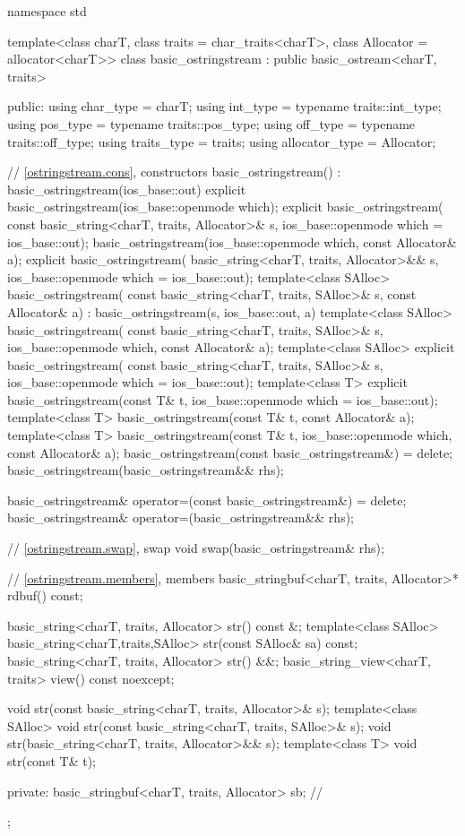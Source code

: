 %
\begin{codeblock}
namespace std {
  template<class charT, class traits = char_traits<charT>,
           class Allocator = allocator<charT>>
  class basic_ostringstream : public basic_ostream<charT, traits> {
  public:
    using char_type      = charT;
    using int_type       = typename traits::int_type;
    using pos_type       = typename traits::pos_type;
    using off_type       = typename traits::off_type;
    using traits_type    = traits;
    using allocator_type = Allocator;

    // \ref{ostringstream.cons}, constructors
    basic_ostringstream() : basic_ostringstream(ios_base::out) {}
    explicit basic_ostringstream(ios_base::openmode which);
    explicit basic_ostringstream(
      const basic_string<charT, traits, Allocator>& s,
      ios_base::openmode which = ios_base::out);
    basic_ostringstream(ios_base::openmode which, const Allocator& a);
    explicit basic_ostringstream(
      basic_string<charT, traits, Allocator>&& s,
      ios_base::openmode which = ios_base::out);
    template<class SAlloc>
      basic_ostringstream(
        const basic_string<charT, traits, SAlloc>& s, const Allocator& a)
        : basic_ostringstream(s, ios_base::out, a) {}
    template<class SAlloc>
      basic_ostringstream(
        const basic_string<charT, traits, SAlloc>& s,
        ios_base::openmode which, const Allocator& a);
    template<class SAlloc>
      explicit basic_ostringstream(
        const basic_string<charT, traits, SAlloc>& s,
        ios_base::openmode which = ios_base::out);
    template<class T>
      explicit basic_ostringstream(const T& t, ios_base::openmode which = ios_base::out);
    template<class T>
      basic_ostringstream(const T& t, const Allocator& a);
    template<class T>
      basic_ostringstream(const T& t, ios_base::openmode which, const Allocator& a);
    basic_ostringstream(const basic_ostringstream&) = delete;
    basic_ostringstream(basic_ostringstream&& rhs);

    basic_ostringstream& operator=(const basic_ostringstream&) = delete;
    basic_ostringstream& operator=(basic_ostringstream&& rhs);

    // \ref{ostringstream.swap}, swap
    void swap(basic_ostringstream& rhs);

    // \ref{ostringstream.members}, members
    basic_stringbuf<charT, traits, Allocator>* rdbuf() const;

    basic_string<charT, traits, Allocator> str() const &;
    template<class SAlloc>
      basic_string<charT,traits,SAlloc> str(const SAlloc& sa) const;
    basic_string<charT, traits, Allocator> str() &&;
    basic_string_view<charT, traits> view() const noexcept;

    void str(const basic_string<charT, traits, Allocator>& s);
    template<class SAlloc>
      void str(const basic_string<charT, traits, SAlloc>& s);
    void str(basic_string<charT, traits, Allocator>&& s);
    template<class T>
      void str(const T& t);

   private:
    basic_stringbuf<charT, traits, Allocator> sb;   // \expos
  };
}
\end{codeblock}


